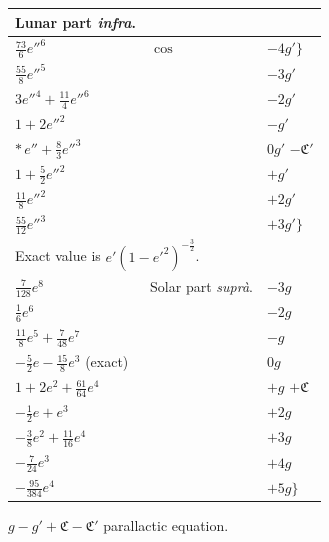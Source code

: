 \documentclass[12pt,a4paper]{article}
\theoremstyle{plain}
\begin{document}
\begin{center}
\begin{tabular}{|l|l|l|}
\hline
\multicolumn{1}{|c|}{Lunar part \textit{infra}.} & & \\
\hline
$\tfrac{73}{6}e''^{6}$                & $\cos$ & $-4g'\bigr\}$ \\
$\tfrac{55}{8}e''^{5}$                &        & $-3g'$ \\
$3e''^{4}+\tfrac{11}{4}e''^{6}$       &        & $-2g'$ \\
$1+2e''^{2}$                          &        & $-g'$ \\
$*\,e''+\tfrac{8}{3}e''^{3}$          &        & $0g'$ \quad $-\mathfrak{C}'$ \\
$1+\tfrac{5}{2}e''^{2}$               &        & $+g'$ \\
$\tfrac{11}{8}e''^{2}$                &        & $+2g'$ \\
$\tfrac{55}{12}e''^{3}$               &        & $+3g'\bigr\}$ \\
\hline
\multicolumn{3}{|l|}{\small * Exact value is $e'(1-e'^{2})^{-\frac{3}{2}}$.} \\
\hline
$\tfrac{7}{128}e^{8}$                                & Solar part \textit{supr\`a}. & $-3g$ \\
$\tfrac{1}{6}e^{6}$                                  &                              & $-2g$ \\
$\tfrac{11}{8}e^{5}+\tfrac{7}{48}e^{7}$              &                              & $-g$ \\
$-\tfrac{5}{2}e-\tfrac{15}{8}e^{3}$ (exact)          &                              & $0g$ \\
$1+2e^{2}+\tfrac{61}{64}e^{4}$                       &                              & $+g$ \quad $+\mathfrak{C}$ \\
$-\tfrac{1}{2}e+e^{3}$                               &                              & $+2g$ \\
$-\tfrac{3}{8}e^{2}+\tfrac{11}{16}e^{4}$             &                              & $+3g$ \\
$-\tfrac{7}{24}e^{3}$                                &                              & $+4g$ \\
$-\tfrac{95}{384}e^{4}$                              &                              & $+5g\bigr\}$ \\
\hline
\end{tabular}
\end{center}

\noindent $g-g'+\mathfrak{C}-\mathfrak{C}'$ parallactic equation.
\end{document}
